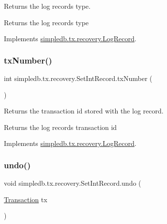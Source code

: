 Returns the log record\textquotesingle{}s type. \begin{DoxyReturn}{Returns}
the log record\textquotesingle{}s type 
\end{DoxyReturn}


Implements \hyperlink{interfacesimpledb_1_1tx_1_1recovery_1_1LogRecord_aa97a8907de4709c2b3596e8c9709a26c}{simpledb.\+tx.\+recovery.\+Log\+Record}.

\mbox{\label{classsimpledb_1_1tx_1_1recovery_1_1SetIntRecord_aaadefbf9f55cefb7308df960c329a21e}} 
\subsubsection{\texorpdfstring{tx\+Number()}{txNumber()}}
{\footnotesize\ttfamily int simpledb.\+tx.\+recovery.\+Set\+Int\+Record.\+tx\+Number (\begin{DoxyParamCaption}{ }\end{DoxyParamCaption})\hspace{0.3cm}{\ttfamily [inline]}}

Returns the transaction id stored with the log record. \begin{DoxyReturn}{Returns}
the log record\textquotesingle{}s transaction id 
\end{DoxyReturn}


Implements \hyperlink{interfacesimpledb_1_1tx_1_1recovery_1_1LogRecord_a167f7406c18bf3367f1b83f6853870db}{simpledb.\+tx.\+recovery.\+Log\+Record}.

\mbox{\label{classsimpledb_1_1tx_1_1recovery_1_1SetIntRecord_a917897bef9acb164bed44eb6655f6835}} 
\subsubsection{\texorpdfstring{undo()}{undo()}}
{\footnotesize\ttfamily void simpledb.\+tx.\+recovery.\+Set\+Int\+Record.\+undo (\begin{DoxyParamCaption}\item[{\hyperlink{classsimpledb_1_1tx_1_1Transaction}{Transaction}}]{tx }\end{DoxyParamCaption})\hspace{0.3cm}{\ttfamily [inline]}}

